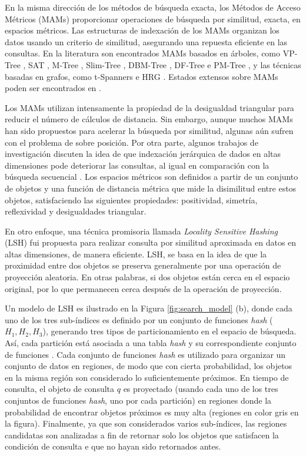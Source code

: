 En la misma dirección de los métodos de búsqueda exacta, los Métodos de Acceso Métricos (MAMs) proporcionar operaciones de búsqueda por similitud, exacta, en espacios métricos. Las estructuras de indexación de los MAMs organizan los datos usando un criterio de similitud, asegurando una repuesta eficiente en las consultas. En la literatura son encontrados MAMs basados en árboles, como \mbox{VP-Tree} \cite{cit:vpt}, SAT \cite{SATree}, \mbox{M-Tree} \cite{MTree}, Slim-Tree \cite{SlimTree}, DBM-Tree \cite{DBMTree}, DF-Tree \cite{dftree} e PM-Tree \cite{pmtree}, y las técnicas basadas en grafos, como \mbox{t-Spanners} \cite{cit:tspanners02} e HRG \cite{hrg}. Estados extensos sobre MAMs poden ser encontrados en \cite{cit:avez99searching, cit:indexDriven, cit:clarkson_nn_survey}.

Los MAMs utilizan intensamente la propiedad de la desigualdad triangular para reducir el número de cálculos de distancia. Sin embargo, aunque muchos MAMs han sido propuestos para acelerar la búsqueda por similitud, algunas aún sufren con el problema de sobre posición. Por otra parte, algunos trabajos de investigación discuten la idea de que indexación jerárquica de dados en altas dimensiones pode deteriorar las consultas, al igual en comparación con la búsqueda secuencial \cite{aleman_high_dimensional, WhatsWrong}. Los espacios métricos son definidos a partir de un conjunto de objetos y una función de distancia métrica que mide la disimilitud entre estos objetos, satisfaciendo las siguientes propiedades: positividad, simetría, reflexividad y desigualdades triangular.

En otro enfoque, una técnica promisoria llamada \textit{Locality Sensitive Hashing} (LSH) \cite{Datar2004} fui propuesta para realizar consulta por similitud aproximada en datos en altas dimensiones, de manera eficiente.  LSH, se basa en la idea de que la proximidad entre dos objetos se preserva generalmente por una operación de proyección aleatoria. En otras palabras, si dos objetos están cerca en el espacio original, por lo que permanecen cerca después de la operación de proyección.

Un modelo de  LSH es ilustrado en la Figura  \ref{fig:search_model} (b), donde cada uno de los tres sub-índices es definido por un conjunto de funciones \textit{hash} ($H_1, H_2, H_3$), generando tres tipos de particionamiento en el espacio de búsqueda. Así, cada partición está asociada a una tabla \textit{hash} y su correspondiente conjunto de funciones . Cada conjunto de funciones \textit{hash} es utilizado para organizar un conjunto de datos en regiones, de modo que con cierta probabilidad, los objetos en la misma región son considerado lo suficientemente próximos. En tiempo de consulta, el objeto de consulta $q$ es proyectado (usando cada uno de los tres conjuntos de funciones \textit{hash}, uno por cada partición) en regiones donde la probabilidad de encontrar objetos próximos es muy alta (regiones en color gris en la figura). Finalmente, ya que son considerados varios sub-índices, las regiones candidatas son analizadas a fin de retornar solo los objetos que satisfacen la condición de consulta e que no hayan sido retornados antes.


